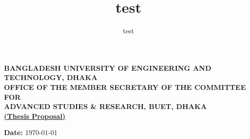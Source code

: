 \documentclass[12pt,addpoints,fleqn]{exam}
\title{test}
\author{test}
\begin{document}
\begin{center}
    {
        \textbf{BANGLADESH UNIVERSITY OF ENGINEERING AND TECHNOLOGY, DHAKA}\\
        \textbf{OFFICE OF THE MEMBER SECRETARY OF THE COMMITTEE FOR\\ADVANCED STUDIES \& RESEARCH, BUET, DHAKA}\\
        \vspace*{0.2cm}
        \textbf{\ul{(Thesis Proposal)}}
    }\\
\end{center}
\begin{minipage}[t]{0.7\textwidth}
\hfill
\end{minipage}
\begin{minipage}[t]{0.3\textwidth}
\flushleft
\textbf{Date:} \today
\end{minipage}
\end{document}
